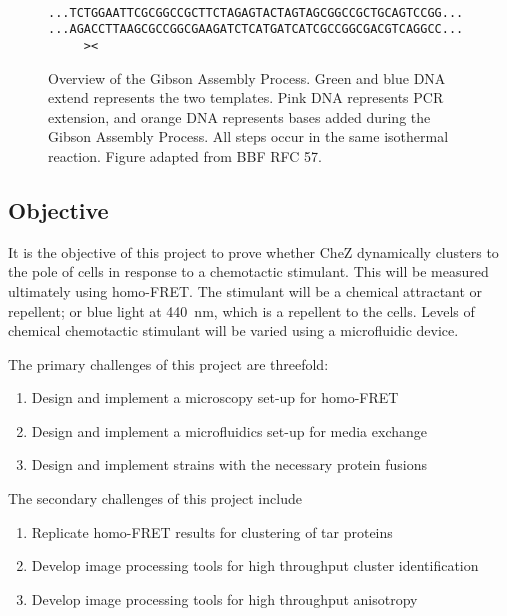 \documentclass[../main.tex]{subfiles}
\begin{document}
\begin{figure}[p]
{{\\
\texttt{\color{DarkGreen}...TCTGGAATTCGCGGCCGCTTCTAGAG\color{RubineRed}TACTAGTAGCGGCCGC\color{YellowOrange}TGCAGTC\color{DarkBlue}CGG...}
\\
\texttt{\color{DarkGreen}...AGA\color{YellowOrange}CCTTAAG\color{RubineRed}CGCCGGCGAAGATCTC\color{DarkBlue}ATGATCATCGCCGGCGACGTCAGGCC...}
\\
\texttt{\color{black}\ \ \ \ \ ><\ \ \ }
}
\label{fig:gibson:5}
}
\caption[Overview of the Gibson Assembly Process]{Overview of the Gibson Assembly Process. Green and blue DNA extend represents the two templates. Pink DNA represents PCR extension, and orange DNA represents bases added during the Gibson Assembly Process. All steps occur in the same isothermal reaction. Figure adapted from BBF RFC 57\citep{rfc57}.}
\label{fig:gibson}
\end{figure}

\subsection{Objective}
It is the objective of this project to prove whether CheZ dynamically clusters to the pole of \ecoli cells in response to a chemotactic stimulant. This will be measured ultimately using homo-FRET. The stimulant will be a chemical attractant or repellent; or blue light at \SI{440}{\nano\meter}\citep{wright06}, which is a repellent to the cells. Levels of chemical chemotactic stimulant will be varied using a microfluidic device.

The primary challenges of this project are threefold:
\begin{enumerate}
\item Design and implement a microscopy set-up for homo-FRET
\item Design and implement a microfluidics set-up for media exchange
\item Design and implement \ecoli strains with the necessary protein fusions
\end{enumerate}

The secondary challenges of this project include
\begin{enumerate}
\item Replicate homo-FRET results for clustering of tar proteins
\item Develop image processing tools for high throughput cluster identification
\item Develop image processing tools for high throughput anisotropy
\end{enumerate}
\end{document}
